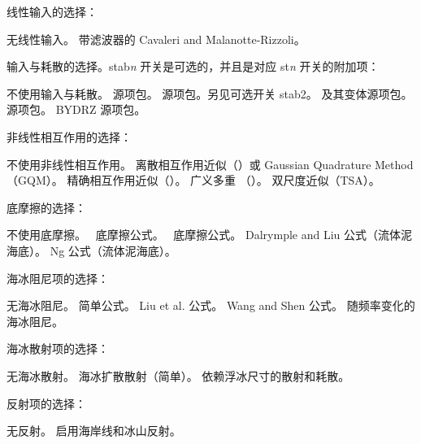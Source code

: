 \noindent
线性输入的选择：
\begin{slist}
 {无线性输入。}
 {带滤波器的 Cavaleri and Malanotte-Rizzoli。}
\end{slist}

\noindent
输入与耗散的选择。{\F stab{}\it n} 开关是可选的，并且是对应 {\F st{\it n}} 开关的附加项：
\begin{slist}
 {不使用输入与耗散。}
 {\wam{} 源项包。}
 {\cite{tol:JPO96} 源项包。另见可选开关 {\F stab2}。}
 {\wam{} 及其变体源项包。}
 {\cite{art:Aea10} 源项包。}
 {BYDRZ 源项包。}
\end{slist}

\noindent
非线性相互作用的选择：
\begin{slist}
 {不使用非线性相互作用。}
 {离散相互作用近似（\dia）或 Gaussian Quadrature Method（GQM）。}
 {精确相互作用近似（\xnl）。}
 {广义多重 \dia{}（\gmd{}）。}
 {双尺度近似（TSA）。}
\end{slist}

\noindent
底摩擦的选择：
\begin{slist}
 {不使用底摩擦。}
 {\js\ 底摩擦公式。}
 {\showex\ 底摩擦公式。}
 {Dalrymple and Liu 公式（流体泥海底）。}
 {Ng 公式（流体泥海底）。}
\end{slist}

\noindent
海冰阻尼项的选择：
\begin{slist}
 {无海冰阻尼。}
 {简单公式。}
 {Liu et al. 公式。}
 {Wang and Shen 公式。}
 {随频率变化的海冰阻尼。}
\end{slist}

\noindent
海冰散射项的选择：
\begin{slist}
 {无海冰散射。}
 {海冰扩散散射（简单）。}
 {依赖浮冰尺寸的散射和耗散。}
\end{slist}

\noindent
反射项的选择：
\begin{slist}
 {无反射。}
 {启用海岸线和冰山反射。}
\end{slist}

